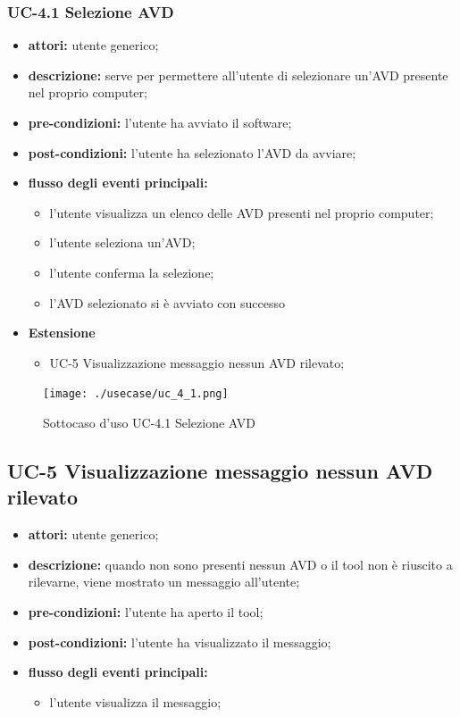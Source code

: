 \subsubsection*{UC-4.1 Selezione AVD}\label{subsubsec:uc-4.1-selezione-avd}
\begin{itemize}
    \item \textbf{attori:} utente generico;
    \item \textbf{descrizione:} serve per permettere all'utente di selezionare un'AVD presente nel proprio computer;
    \item \textbf{pre-condizioni:} l'utente ha avviato il software;
    \item \textbf{post-condizioni:} l'utente ha selezionato l'AVD da avviare;
    \item \textbf{flusso degli eventi principali:}
    \begin{itemize}
        \item l'utente visualizza un elenco delle AVD presenti nel proprio computer;
        \item l'utente seleziona un'AVD;
        \item l'utente conferma la selezione;
        \item l'AVD selezionato si è avviato con successo
    \end{itemize}
    \item \textbf{Estensione}
    \begin{itemize}
        \item UC-5 Visualizzazione messaggio nessun AVD rilevato;
    \end{itemize}
\end{itemize}
\begin{figure}
    \centering
    \texttt{[image: ./usecase/uc\_4\_1.png]}
    \caption{Sottocaso d'uso UC-4.1 Selezione AVD}
\end{figure}

\subsection*{UC-5 Visualizzazione messaggio nessun AVD rilevato} \label{subsec:uc-5-visualizzazione-messaggio-nessun-avd-rilevato}
\begin{itemize}
    \item \textbf{attori:} utente generico;
    \item \textbf{descrizione:} quando non sono presenti nessun AVD o il tool non è riuscito a rilevarne, viene mostrato un messaggio all'utente;
    \item \textbf{pre-condizioni:} l'utente ha aperto il tool;
    \item \textbf{post-condizioni:} l'utente ha visualizzato il messaggio;
    \item \textbf{flusso degli eventi principali:}
    \begin{itemize}
        \item l'utente visualizza il messaggio;
    \end{itemize}
\end{itemize}
